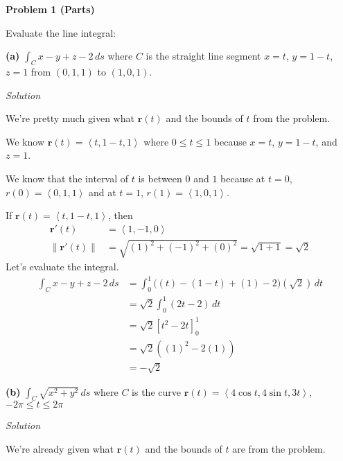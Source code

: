 \documentclass{article}
\newcommand{\lrp}[1]{\left( #1 \right)}
\newcommand{\lra}[1]{\left\langle #1 \right\rangle}
\newcommand{\lrb}[1]{\left[ #1 \right]}
\newcommand{\norm}[1]{\left\lVert #1 \right\rVert}
\renewcommand{\r}[0]{\mathbf{r}}
\newcommand{\Solution}{\textit{Solution}}
\begin{document}
{}\textbf{Problem 1 (Parts)}

Evaluate the line integral:

{}\textbf{(a)} $\displaystyle\int_{C}x-y+z-2\,ds$ where $C$ is the straight line segment $x=t$, $y=1-t$, $z=1$ from $(0,1,1)$ to $(1,0,1)$.

\Solution

We're pretty much given what $\r(t)$ and the bounds of $t$ from the problem. 

We know $\r(t)=\lra{t,1-t,1}$ where $0\leq  t \leq 1$ because $x=t$, $y=1-t$, and $z=1$.

We know that the interval of $t$ is between $0$ and $1$ because at $t=0$, $r(0)=\lra{0,1,1}$ and at $t=1$, $r(1)=\lra{1,0,1}$.

If $\r(t)=\lra{t,1-t,1}$, then
\begin{align*}
    \r'(t)&=\lra{1,-1,0}\\
    \norm{\r'(t)}&=\sqrt{(1)^2+(-1)^2+(0)^2}=\sqrt{1+1}=\sqrt{2}
\end{align*}
Let's evaluate the integral.
\begin{align*}
    \int_{C}x-y+z-2\,ds&=\int_0^1 \bigg((t)-(1-t)+(1)-2\bigg)\lrp{\sqrt{2}}\,dt\\
    &=\sqrt{2}\int_0^1\lrp{2t-2}\,dt\tag{we can move constants outside}\\
    &=\sqrt{2}\lrb{t^2-2t}_0^1\\
    &=\sqrt{2}\lrp{(1)^2-2(1)}\\
    &=\boxed{-\sqrt{2}}
\end{align*}
{}\textbf{(b)} $\displaystyle\int_{C}\sqrt{x^2+y^2}\,ds$ where $C$ is the curve $\r(t)=\lra{4\cos t,4\sin t, 3t}$, $-2\pi\leq t \leq 2\pi$

\Solution

We're already given what $\r(t)$ and the bounds of $t$ are from the problem. 
\end{document}

